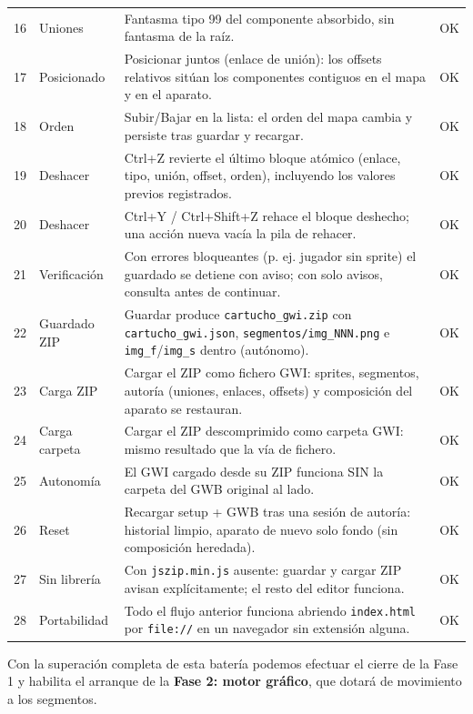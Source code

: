 \begin{small}
\begin{tabularx}{\textwidth}{c >{\hsize}L >{\hsize}L c}
		16 & Uniones & Fantasma tipo 99 del componente absorbido, sin fantasma de la raíz. & OK \\ 
		17 & Posicionado & Posicionar juntos (enlace de unión): los offsets relativos sitúan los componentes contiguos en el mapa y en el aparato. & OK \\ 
		18 & Orden & Subir/Bajar en la lista: el orden del mapa cambia y persiste tras guardar y recargar. & OK \\ 
		19 & Deshacer & Ctrl+Z revierte el último bloque atómico (enlace, tipo, unión, offset, orden), incluyendo los valores previos registrados. & OK \\ 
		20 & Deshacer & Ctrl+Y / Ctrl+Shift+Z rehace el bloque deshecho; una acción nueva vacía la pila de rehacer. & OK \\ 
		21 & Verificación & Con errores bloqueantes (p. ej. jugador sin sprite) el guardado se detiene con aviso; con solo avisos, consulta antes de continuar. & OK \\ 
		22 & Guardado ZIP & Guardar produce \texttt{cartucho\_gwi.zip} con \texttt{cartucho\_gwi.json}, \texttt{segmentos/img\_NNN.png} e \texttt{img\_f}/\texttt{img\_s} dentro (autónomo). & OK \\ 
		23 & Carga ZIP & Cargar el ZIP como fichero GWI: sprites, segmentos, autoría (uniones, enlaces, offsets) y composición del aparato se restauran. & OK \\ 
		24 & Carga carpeta & Cargar el ZIP descomprimido como carpeta GWI: mismo resultado que la vía de fichero. & OK \\ 
		25 & Autonomía & El GWI cargado desde su ZIP funciona SIN la carpeta del GWB original al lado. & OK \\ 
		26 & Reset & Recargar setup + GWB tras una sesión de autoría: historial limpio, aparato de nuevo solo fondo (sin composición heredada). & OK \\ 
		27 & Sin librería & Con \texttt{jszip.min.js} ausente: guardar y cargar ZIP avisan explícitamente; el resto del editor funciona. & OK \\ 
		28 & Portabilidad & Todo el flujo anterior funciona abriendo \texttt{index.html} por \texttt{file://} en un navegador sin extensión alguna. & OK \\
	\end{tabularx}
	\nopagebreak
	\label{tab:PruebasFase1}
\end{small}

Con la superación completa de esta batería podemos efectuar el cierre de la Fase 1 y habilita el arranque de la \textbf{Fase 2: motor gráfico}, que dotará de movimiento a los segmentos.

\clearpage

